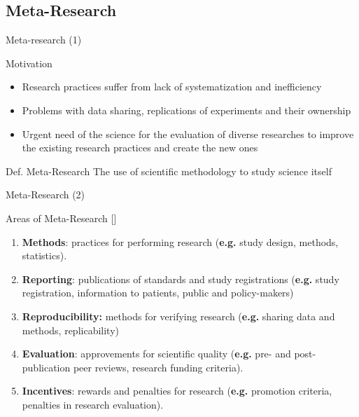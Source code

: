 \documentclass[16:9,en,navbarside]{sdqbeamer}
\begin{document}
\subsection{Meta-Research}
\begin{frame}{Meta-research (1)}
\pause
     \begin{block}{Motivation}
        \begin{itemize}
			\item Research practices suffer from lack of systematization and inefficiency
			\pause
			\item Problems with data sharing, replications of experiments and their ownership
			\pause
			\item Urgent need of the science for the evaluation of diverse researches to improve the existing research practices and create the new ones
		\end{itemize}
    \end{block}
    \pause
    \begin{alertblock}{Def. Meta-Research}
       The use of scientific methodology to study science itself 
    \end{alertblock}
\end{frame}

\begin{frame}{Meta-Research (2)}
     \begin{block}{Areas of Meta-Research [\cite{Ioa15}]}
        \begin{enumerate}
			\item<1->{\textbf{Methods}:} practices for performing research  (\textbf{e.g.} study design, methods, statistics). 
			\item<2->{\textbf{Reporting}:} publications of standards and study registrations  (\textbf{e.g.} study registration, information to patients, public and policy-makers)
			
			\item<3->\textbf{{Reproducibility}:} methods for verifying research (\textbf{e.g.} sharing data and methods, replicability)
			
			\item<4->{\textbf{Evaluation}:} approvements for scientific quality (\textbf{e.g.} pre- and post-publication peer reviews, research funding criteria).
			 
			\item<5->{\textbf{Incentives}:} rewards and penalties for research (\textbf{e.g.} promotion criteria, penalties in research evaluation).
		\end{enumerate}
    \end{block}
\end{frame}
\end{document}
